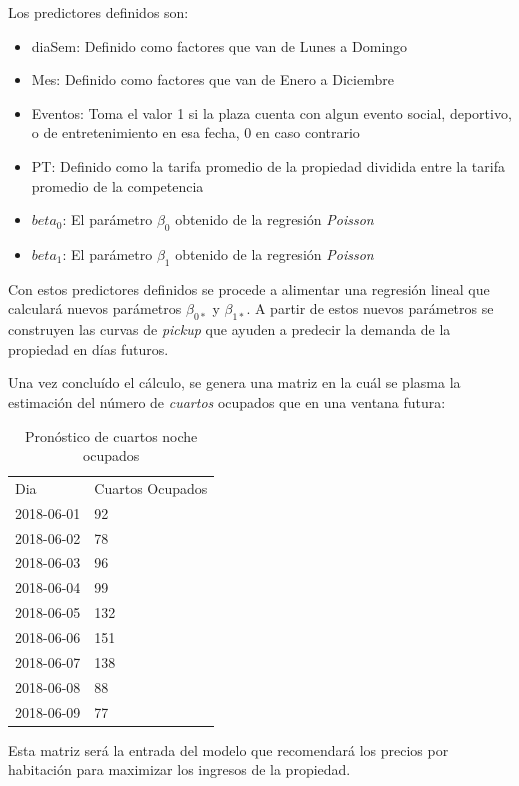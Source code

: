Los predictores definidos son:

\begin{itemize}
  \item diaSem: Definido como factores que van de Lunes a Domingo
  \item Mes: Definido como factores que van de Enero a Diciembre
  \item Eventos: Toma el valor 1 si la plaza cuenta con algun evento social, deportivo, o de entretenimiento en esa fecha, 0 en caso contrario
  \item PT: Definido como la tarifa promedio de la propiedad dividida entre la tarifa promedio de la competencia
  \item $beta_0$: El parámetro $\beta_0$ obtenido de la regresión \emph{Poisson}
  \item $beta_1$: El parámetro $\beta_1$ obtenido de la regresión \emph{Poisson}
\end{itemize}


Con estos predictores definidos se procede a alimentar una regresión lineal que calculará nuevos parámetros $\beta_{0*}$ y $\beta_{1*}$. A partir de estos nuevos parámetros se construyen las curvas de \emph{pickup} que ayuden a predecir la demanda de la propiedad en días futuros.

Una vez concluído el cálculo, se genera una matriz en la cuál se plasma la estimación del número de \emph{cuartos} ocupados que en una ventana futura:

\begin{table}[H]
\centering
\begin{tabular}{ll}
Dia        & Cuartos Ocupados \\
2018-06-01 & 92               \\
2018-06-02 & 78               \\
2018-06-03 & 96               \\
2018-06-04 & 99               \\
2018-06-05 & 132              \\
2018-06-06 & 151              \\
2018-06-07 & 138              \\
2018-06-08 & 88               \\
2018-06-09 & 77              
\end{tabular}
\caption{Pronóstico de cuartos noche ocupados} 
\end{table}

Esta matriz será la entrada del modelo que recomendará los precios por habitación para maximizar los ingresos de la propiedad.


